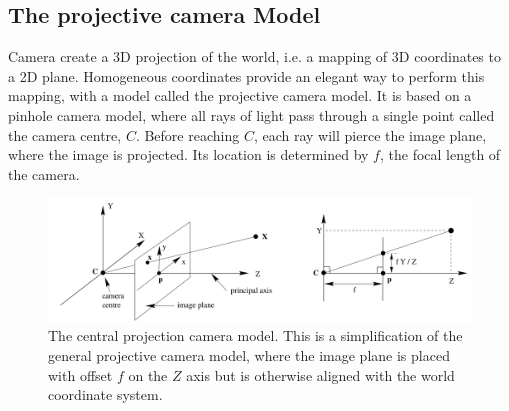 \subsection{The projective camera Model}\label{camera-model}
Camera create a 3D projection of the world, i.e. a mapping of 3D coordinates to a 2D plane.
Homogeneous coordinates provide an elegant way to perform this mapping, with a model called the projective camera model.
It is based on a pinhole camera model, where all rays of light pass through a single point called the camera centre, $C$. Before reaching $C$, each ray will pierce the image plane, where the image is projected.
Its location is determined by $f$, the focal length of the camera.

\begin{figure}
\begin{center}
\includegraphics[width=1.0\textwidth]{figures/central_projection_camera.png}
\end{center}
\caption{The central projection camera model. This is a simplification of the general projective camera model, where the image plane is placed with offset $f$ on the $Z$ axis but is otherwise aligned with the world coordinate system.}
\label{fig:central_projection_camera} %
\end{figure}


